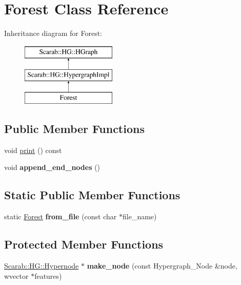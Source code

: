 \hypertarget{classForest}{
\section{Forest Class Reference}
\label{classForest}
}
Inheritance diagram for Forest:\begin{figure}[H]
\begin{center}
\leavevmode
\includegraphics[height=3cm]{classForest}
\end{center}
\end{figure}
\subsection*{Public Member Functions}
\begin{DoxyCompactItemize}
\item 
void \hyperlink{classForest_a621a1a65d0f877bb33b15c79f9e24c4d}{print} () const 
\item 
\hypertarget{classForest_a4cc0cf94c18913eadd0b36f3dcf68cef}{
void {\bfseries append\_\-end\_\-nodes} ()}
\label{classForest_a4cc0cf94c18913eadd0b36f3dcf68cef}

\end{DoxyCompactItemize}
\subsection*{Static Public Member Functions}
\begin{DoxyCompactItemize}
\item 
\hypertarget{classForest_a1b9ddc0e03c1ccfcc73987fe9378fa84}{
static \hyperlink{classForest}{Forest} {\bfseries from\_\-file} (const char $\ast$file\_\-name)}
\label{classForest_a1b9ddc0e03c1ccfcc73987fe9378fa84}

\end{DoxyCompactItemize}
\subsection*{Protected Member Functions}
\begin{DoxyCompactItemize}
\item 
\hypertarget{classForest_ab40070ea9e3885d252fb7848c11f27ef}{
\hyperlink{classScarab_1_1HG_1_1Hypernode}{Scarab::HG::Hypernode} $\ast$ {\bfseries make\_\-node} (const Hypergraph\_\-Node \&node, wvector $\ast$features)}
\label{classForest_ab40070ea9e3885d252fb7848c11f27ef}

\end{DoxyCompactItemize}


